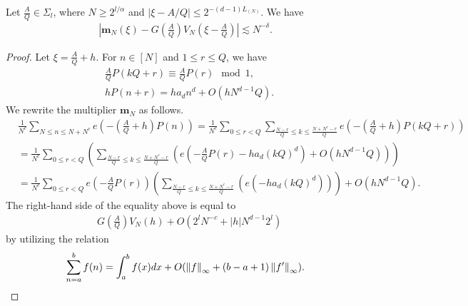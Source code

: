 \documentclass[10pt,a4paper]{amsart}
\def\d{{\rm d}}
\begin{document}
	\begin{proposition}\label{p:majorarcalldeg}
		Let $\frac{A}{Q} \in \Sigma_l$, where $ N \geq 2^{l/\alpha} $ and $|\xi - A/Q| \leq 2^{-(d-1)L_{(N)}} $. We have 
		\begin{align}\label{eq approx on major arcs}
			\left|	\mathbf{m}_N(\xi) -G\left (\frac{A}{Q}\right ) V_N \left( \xi - \frac{A}{Q}\right) \right|  \lesssim N^{-\delta}. 
		\end{align}
	\end{proposition}

	\begin{proof}
		Let $ \xi=\frac{A}{Q}+h$. For $n \in [N]$ and $1 \leq r \leq Q$, we have 
		\begin{align*}
			& \frac{A}{Q} P(kQ+r) \equiv \frac{A}{Q}P(r) \mod 1, \\
			& hP(n+r) =h a_dn^d+O\left(h N^{d-1}Q \right).
		\end{align*}
		We rewrite the multiplier $\mathbf{m}_N$ as follows. 
		\begin{align*}
			& \frac{1}{N^c} \sum_{N \leq n \leq N+N^c}e\left(- \left(\frac{A}{Q}+h\right) P(n) \right)=\frac{1}{N^c} \sum_{0 \leq r<Q} \sum_{ \frac{N-r}{Q} \leq k \leq \frac{N+N^c-r}{Q} } e\left(-  \left(\frac{A}{Q}+h\right) P(kQ+r)  \right) \\ 
			& = \frac{1}{N^c} \sum_{0 \leq r<Q} \left(\sum_{ \frac{N-r}{Q} \leq k \leq \frac{N+N^c-r}{Q} }\left(e\left( -\frac{A}{Q} P(r)-ha_d(kQ)^d \right) +O\left(hN^{d-1}Q\right)\right) \right) \\ 
			& =\frac{1}{N^c} \sum_{0 \leq r<Q}e\left(-\frac{A}{Q} P(r)\right) \left(\sum_{\frac{N-r}{Q} \leq k \leq \frac{N+N^c-r}{Q}}\left(e(-ha_d(kQ)^d)\right) \right)+ O\left(hN^{d-1}Q\right) . 
		\end{align*}
		The right-hand side of the equality above is equal to 
		\begin{align*}
			&  G\left (\frac{A}{Q}\right ) V_{N}(h)  + O\left(  2^l N^{-c} + |h| N^{d-1} 2^l  \right) 
		\end{align*}
		by utilizing the relation \[ \sum_{n=a}^bf(n)=\int_{a}^bf(x) \d x +O( \left \| f \right \|_{\infty}+(b-a+1) \left \| f' \right \|_{\infty} ).  \]

	\end{proof}
\end{document}
